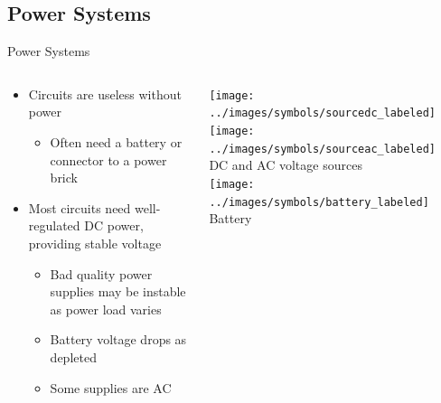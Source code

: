 \documentclass{beamer}
\begin{document}
\subsection{Power Systems}
\begin{frame}{Power Systems}
  \begin{columns}[T]
    \begin{column}{.6\textwidth}
      \begin{itemize}
        \item Circuits are useless without power
        \begin{itemize}
          \item Often need a battery or connector to a power brick
        \end{itemize}
        \item Most circuits need well-regulated DC power, providing stable voltage
        \begin{itemize}
          \item Bad quality power supplies may be instable as power load varies
          \item Battery voltage drops as depleted
          \item Some supplies are AC
        \end{itemize}        
      \end{itemize}
    \end{column}

    \begin{column}{0.4\textwidth} \centering
      \texttt{[image: ../images/symbols/sourcedc\_labeled]}
      \texttt{[image: ../images/symbols/sourceac\_labeled]} \\
      DC and AC voltage sources \\
      \texttt{[image: ../images/symbols/battery\_labeled]} \\
      Battery
    \end{column}
  \end{columns}
\end{frame}
\end{document}
